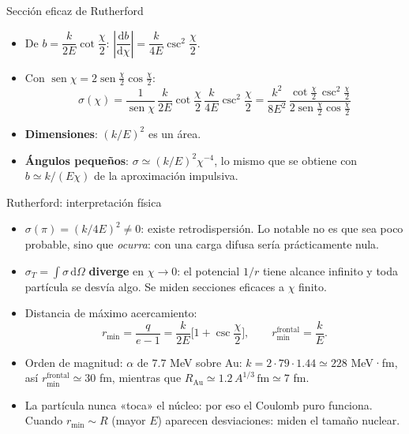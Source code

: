 \documentclass[aspectratio=169]{beamer}
\providecommand{\sen}{}
\renewcommand{\sen}{\operatorname{sen}}
\newcommand{\rmin}{r_{\min}}
\newcommand{\dd}{\mathrm{d}}
\begin{document}
\begin{frame}{Sección eficaz de Rutherford}
\begin{itemize}
  \item<1-> De $b=\dfrac{k}{2E}\cot\dfrac{\chi}{2}$:\;
        $\left|\dfrac{\dd b}{\dd\chi}\right|=\dfrac{k}{4E}\csc^{2}\dfrac{\chi}{2}$.
  \item<2-> Con $\sen\chi=2\sen\frac{\chi}{2}\cos\frac{\chi}{2}$:
  \[
    \sigma(\chi)=\frac{1}{\sen\chi}\,\frac{k}{2E}\cot\frac{\chi}{2}\,
      \frac{k}{4E}\csc^{2}\frac{\chi}{2}
    =\frac{k^{2}}{8E^{2}}\,
      \frac{\cot\frac{\chi}{2}\,\csc^{2}\frac{\chi}{2}}{2\sen\frac{\chi}{2}\cos\frac{\chi}{2}}
  \]
  \visible<3->{%
  \[
    \boxed{\;\sigma(\chi)=\Big(\frac{k}{4E}\Big)^{2}\frac{1}{\sen^{4}(\chi/2)}\;}
  \]}
  \item<4-> \textbf{Dimensiones}: $(k/E)^{2}$ es un área. \checkmark
  \item<5-> \textbf{Ángulos pequeños}: $\sigma\simeq(k/E)^{2}\chi^{-4}$, lo mismo que se
        obtiene con $b\simeq k/(E\chi)$ de la aproximación impulsiva. \checkmark
\end{itemize}
\end{frame}

\begin{frame}{Rutherford: interpretación física}
\begin{itemize}
  \item<1-> $\sigma(\pi)=(k/4E)^{2}\neq0$: existe retrodispersión. Lo notable no es que sea
        poco probable, sino que \emph{ocurra}: con una carga difusa sería prácticamente nula.
  \item<2-> $\sigma_T=\int\sigma\,\dd\Omega$ \textbf{diverge} en $\chi\to0$: el potencial
        $1/r$ tiene alcance infinito y toda partícula se desvía algo.
        Se miden secciones eficaces a $\chi$ finito.
  \item<3-> Distancia de máximo acercamiento:
        \[
          \rmin=\frac{q}{e-1}=\frac{k}{2E}\Big[1+\csc\frac{\chi}{2}\Big],
          \qquad \rmin^{\text{frontal}}=\frac{k}{E}.
        \]
  \item<4-> Orden de magnitud: $\alpha$ de $7.7$ MeV sobre Au:
        $k=2\cdot79\cdot1.44\simeq228$ MeV·fm, así
        $\rmin^{\text{frontal}}\simeq30$ fm,
        mientras que $R_{\text{Au}}\simeq1.2\,A^{1/3}\,\text{fm}\simeq7$ fm.
  \item<5-> La partícula nunca «toca» el núcleo: por eso el Coulomb puro funciona.
        Cuando $\rmin\sim R$ (mayor $E$) aparecen desviaciones: miden el tamaño nuclear.
\end{itemize}
\end{frame}
\end{document}
